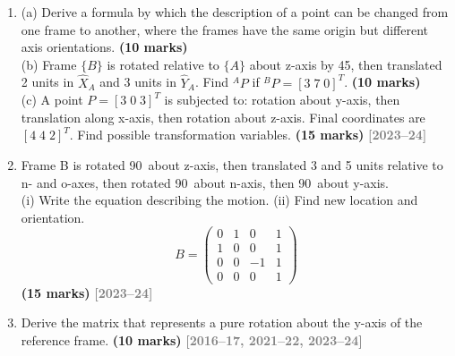 \documentclass[12pt,a3paper]{article}
\newcommand{\yr}[1]{\hfill\textcolor{gray}{\small\textbf{[#1]}}}
\newcommand{\mk}[1]{\textcolor{orange!70!black}{\small\textbf{(#1 marks)}}}
\begin{document}
\begin{enumerate}
\item \label{qlabel:C2-Q1}
(a) Derive a formula by which the description of a point can be changed
from one frame to another, where the frames have the same origin but
different axis orientations. \mk{10}\\
(b) Frame $\{B\}$ is rotated relative to $\{A\}$ about z-axis by
45\textdegree, then translated 2 units in $\hat{X}_A$ and 3 units in
$\hat{Y}_A$. Find ${}^AP$ if ${}^BP = [3\;7\;0]^T$. \mk{10}\\
(c) A point $P = [3\;0\;3]^T$ is subjected to: rotation about y-axis,
then translation along x-axis, then rotation about z-axis. Final
coordinates are $[4\;4\;2]^T$. Find possible transformation
variables. \mk{15}
\yr{2023--24}




\item \label{qlabel:C2-Q2}
Frame B is rotated 90\textdegree\ about z-axis, then translated 3 and 5
units relative to n- and o-axes, then rotated 90\textdegree\ about
n-axis, then 90\textdegree\ about y-axis.\\
(i) Write the equation describing the motion.
(ii) Find new location and orientation.
\[
  B = \begin{pmatrix}
    0&1&0&1\\1&0&0&1\\0&0&{-1}&1\\0&0&0&1
  \end{pmatrix}
\]
\mk{15}
\yr{2023--24}



\item \label{qlabel:C2-Q3}
Derive the matrix that represents a pure rotation about the y-axis of
the reference frame. \mk{10}
\yr{2016--17, 2021--22, 2023--24}





\end{enumerate}
\end{document}
